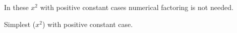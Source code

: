 \documentclass[12pt, a4paper, addpoints]{exam}
\begin{document}
\begin{questions}
\newpage



\question In these $x^2$ with positive constant cases numerical factoring is not needed.
\setlength{\columnsep}{20pt}
\begin{multicols}{3}
\end{multicols}


\question Simplest  ($x^2$) with positive constant case.
\setlength{\columnsep}{20pt}
\begin{multicols}{3}
\end{multicols}
\newpage


















\end{questions}
\end{document}
